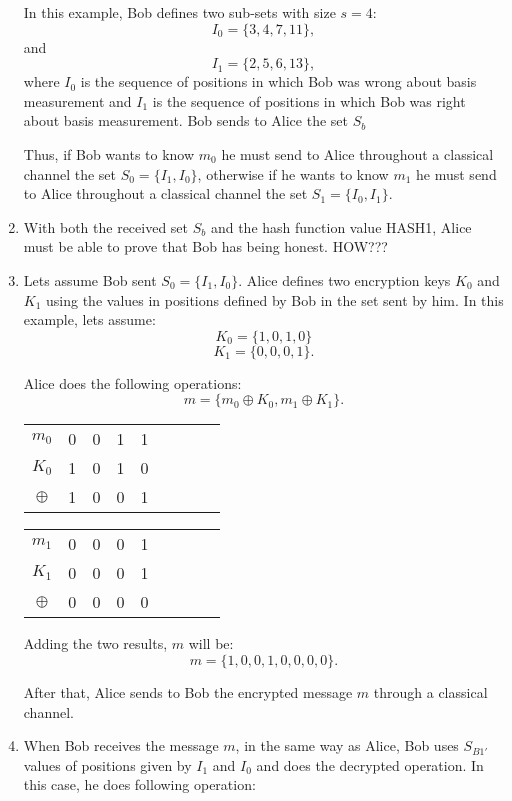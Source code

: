 \begin{enumerate}
  In this example, Bob defines two sub-sets with size $s=4$:
  $$I_{0}=\{3,4,7,11 \},$$
  and $$I_{1}= \{2,5,6,13 \},$$ where $I_{0}$ is the sequence of positions in which Bob was wrong about basis measurement and $I_{1}$ is the sequence of positions in which Bob was right about basis measurement. Bob sends to Alice the set $S_{b}$

  Thus, if Bob wants to know $m_{0}$ he must send to Alice throughout a classical channel the set $S_{0}=\{I_{1},I_{0} \}$, otherwise if he wants to know $m_{1}$ he must send to Alice throughout a classical channel the set $S_{1}=\{I_{0},I_{1} \}$.


  \item With both the received set $S_{b}$ and the hash function value HASH1, Alice must be able to prove that Bob has being honest. HOW???

  \item Lets assume Bob sent $S_{0}=\{I_{1},I_{0} \}$.
   Alice defines two encryption keys $K_{0}$ and $K_{1}$ using the values in positions defined by Bob in the set sent by him. In this example, lets assume: $$K_{0}=\{1,0,1,0\}$$ $$K_{1}=\{0,0,0,1\}.$$

   Alice does the following operations:
   $$m = \{m_{0}\oplus K_{0}, m_{1} \oplus K_{1} \}.$$

   \begin{table}[H]
    \centering
    \begin{tabular}{c|c c c c c c c c}
     $m_{0}$ & 0 & 0 & 1 & 1 \\
     $K_{0}$ & 1 & 0 & 1 & 0 \\ \hline
     $\oplus$ & 1 & 0 & 0 & 1
    \end{tabular}
    \end{table}

   \begin{table}[H]
    \centering
    \begin{tabular}{c|c c c c c c c c}
     $m_{1}$ & 0 & 0 & 0 & 1 \\
     $K_{1}$ & 0 & 0 & 0 & 1 \\ \hline
     $\oplus$ & 0 & 0 & 0 & 0
    \end{tabular}
    \end{table}

    Adding the two results, $m$ will be: $$m=\{1,0,0,1,0,0,0,0\}.$$

   After that, Alice sends to Bob the encrypted message $m$ through a classical channel.

  \item When Bob receives the message $m$, in the same way as Alice, Bob uses $S_{B1\prime}$ values of positions given by $I_{1}$ and $I_{0}$ and does the decrypted operation. In this case, he does following operation:


\end{enumerate}
